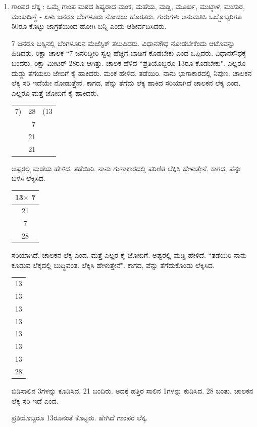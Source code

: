\begin{enumerate}
\item ಗಾಂಪರ ಲೆಕ್ಕ : ಒಮ್ಮೆ ಗಾಂಪ ಮಠದ ಶಿಷ್ಯರಾದ ಮಂಕ, ಮಹೆಯ, ಮಡ್ಡಿ, ಮೂರ್ಖ, ಮುಟ್ಠಾಳ, ಮುಸುರ, ಮಂಕುದಿಣ್ಣೆ  - ಏಳು ಜನರೂ ಬೆಂಗಳೂರು ನೋಡಲು ಹೊರತರು. ಗುರುಗಳು ಅನುಮತಿಸಿ ಒಬ್ಬೊಬ್ಬರಿಗೂ 50ರೂ ಕೊಟ್ಟು ಜಾಗ್ರತೆಯಿಂದ ಹೋಗಿ ಬನ್ನಿ ಎಂದು ಆಶೀರ್ವದಿಸಿದರು. 

7 ಜನರೂ ಬಸ್ಸಿನಲ್ಲಿ ಬೆಂಗಳೂರಿನ ಮೆಜೆಸ್ಟಿಕ್ ತಲುಪಿದರು. ವಿಧಾನಸೌಧ ನೋಡಬೇಕೆಂದು ಆಟೊವನ್ನು ಹಿಡಿದರು. ರಿಕ್ಷಾ ಚಾಲಕ ``7 ಜನರಿದ್ದೀರಿ ಸ್ವಲ್ಪ ಹೆಚ್ಚಿಗೆ ಬಾಡಿಗೆ ಕೊಡಬೇಕು ಎಂದ ಒಪ್ಪಿದರು. ವಿಧಾನಸೌಧಕ್ಕೆ ಬಂದರು. ರಿಕ್ಷಾ ಮೀಟರ್ 28ರೂ ಆಗಿತ್ತು. ಚಾಲಕ ಹೆಳಿದ ``ಪ್ರತಿಯೊಬ್ಬರೂ 13ರೂ ಕೊಡಬೇಕು". ಎಲ್ಲರೂ ದುಡ್ಡು ತೆಗೆಯಲು ಜೇಬಿಗೆ ಕೈ ಹಾಕಿದರು. ಮಂಕ ಹೇಳಿದ. ತಡೆಯಿರಿ. ನಾನು ಭಾಗಾಕಾರದಲ್ಲಿ ನಿಪುಣ. ಚಾಲಕನ ಲೆಕ್ಕ ಸರಿ ಇದೆಯೇ ನೋಡುತ್ತೇನೆ. ಕಾಗದ, ಪೆನ್ನು ತೆಗೆದು ಲೆಕ್ಕ ಹಾಕಿದ ಸರಿಯಾಗಿದೆ ಚಾಲಕನ ಲೆಕ್ಕ ಎಂದ. ಎಲ್ಲರೂ ಮತ್ತೆ ಜೋಬಿಗೆ  ಕೈ ಹಾಕಿದರು. 

\begin{tabular}[t]{l@{\;}r@{\;}l}
7)& 28& (13\\
& 7 & \\
\hline
& 21& \\
& 21 &\\
\hline
\end{tabular}

ಅಷ್ಟರಲ್ಲಿ ಮಡೆಯ ಹೇಳಿದ. ತಡೆಯಿರಿ. ನಾನು ಗುಣಾಕಾರದಲ್ಲಿ ಪರಿಣಿತ ಲೆಕ್ಕಿಸಿ ಹೇಳುತ್ತೇನೆ. ಕಾಗದ, ಪೆನ್ನು ಬಳಸಿ ಲೆಕ್ಕಿಸಿದ. 

\begin{tabular}[t]{c}
13$\times$ 7\\
\hline
21\\
7\\
\hline
28\\
\hline
\end{tabular}

ಸರಿಯಾಗಿದೆ. ಚಾಲಕನ ಲೆಕ್ಕ ಎಂದ. ಮತ್ತೆ ಎಲ್ಲರ ಕೈ ಜೋಬಿಗೆ. ಅಷ್ಟರಲ್ಲಿ ಮಡ್ಡಿ ಹೇಳಿದೆ. ``ತಡೆಯಿರಿ ನಾನು ಕೂಡುವ ಲೆಕ್ಕದಲ್ಲಿ ಬುದ್ಧಿವಂತ. ಲೆಕ್ಕಿಸಿ ಹೇಳುತ್ತೇನೆ". ಕಾಗದ, ಪೆನ್ನು ತೆಗೆದುಕೊಂಡು ಲೆಕ್ಕಿಸಿದ. 

\begin{tabular}[t]{c}
13\\
13\\
13\\
13\\
13\\
13\\
13\\
\hline
28\\
\hline
\end{tabular} 

ಬಿಡಿಸಾಲಿನ 3ಗಳನ್ನು ಕೂಡಿಸಿದ. 21 ಬಂದಿರು. ಅದಕ್ಕೆ ಹತ್ತಿರ ಸಾಲಿನ 1ಗಳನ್ನು ಕುಡಿಸಿದ. 28 ಬಂತು. ಚಾಲಕನ ಲೆಕ್ಕ ಸರಿ ಇದೆ ಎಂದ. 

ಪ್ರತಿಯೊಬ್ಬರೂ 13ರೂನಂತೆ ಕೊಟ್ಟರು. ಹೇಗಿದೆ ಗಾಂಪರ ಲೆಕ್ಕ. 


\end{enumerate}
